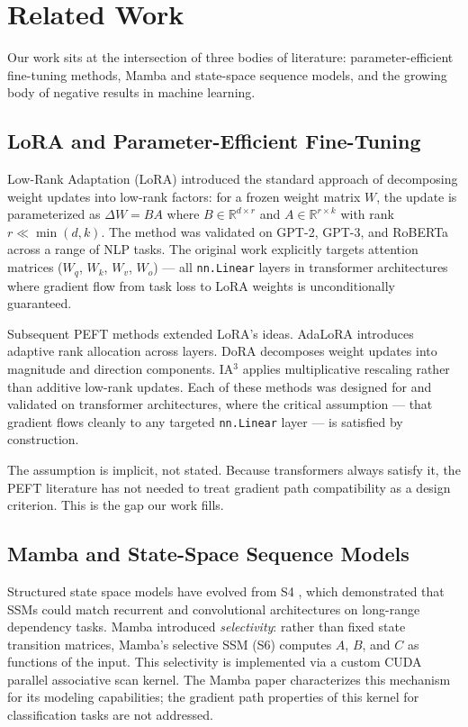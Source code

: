 \section{Related Work}
\label{sec:related}

Our work sits at the intersection of three bodies of literature: parameter-efficient fine-tuning methods, Mamba and state-space sequence models, and the growing body of negative results in machine learning.

\subsection{LoRA and Parameter-Efficient Fine-Tuning}

Low-Rank Adaptation (LoRA) \citep{hu2022lora} introduced the standard approach of decomposing weight updates into low-rank factors: for a frozen weight matrix $W$, the update is parameterized as $\Delta W = BA$ where $B \in \mathbb{R}^{d \times r}$ and $A \in \mathbb{R}^{r \times k}$ with rank $r \ll \min(d, k)$. The method was validated on GPT-2, GPT-3, and RoBERTa across a range of NLP tasks. The original work explicitly targets attention matrices ($W_q$, $W_k$, $W_v$, $W_o$) --- all \texttt{nn.Linear} layers in transformer architectures where gradient flow from task loss to LoRA weights is unconditionally guaranteed.

Subsequent PEFT methods extended LoRA's ideas. AdaLoRA \citep{zhang2023adalora} introduces adaptive rank allocation across layers. DoRA \citep{liu2024dora} decomposes weight updates into magnitude and direction components. IA$^3$ \citep{liu2022ia3} applies multiplicative rescaling rather than additive low-rank updates. Each of these methods was designed for and validated on transformer architectures, where the critical assumption --- that gradient flows cleanly to any targeted \texttt{nn.Linear} layer --- is satisfied by construction.

The assumption is implicit, not stated. Because transformers always satisfy it, the PEFT literature has not needed to treat gradient path compatibility as a design criterion. This is the gap our work fills.

\subsection{Mamba and State-Space Sequence Models}

Structured state space models have evolved from S4 \citep{gu2022s4}, which demonstrated that SSMs could match recurrent and convolutional architectures on long-range dependency tasks. Mamba \citep{gu2023mamba} introduced \emph{selectivity}: rather than fixed state transition matrices, Mamba's selective SSM (S6) computes $A$, $B$, and $C$ as functions of the input. This selectivity is implemented via a custom CUDA parallel associative scan kernel. The Mamba paper characterizes this mechanism for its modeling capabilities; the gradient path properties of this kernel for classification tasks are not addressed.

